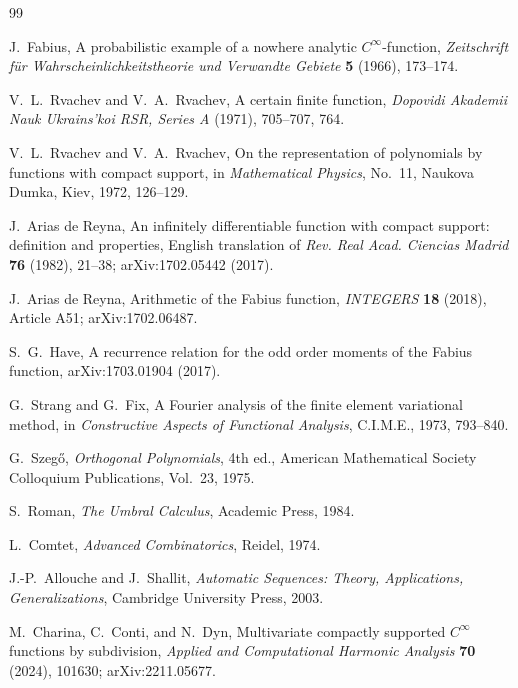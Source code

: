 \documentclass[11pt,oneside]{article}
\numberwithin{equation}{section}
\theoremstyle{definition}
\theoremstyle{remark}
\begin{document}
\begin{thebibliography}{99}

J.~Fabius,
\newblock A probabilistic example of a nowhere analytic $C^\infty$-function,
\newblock \emph{Zeitschrift f\"ur Wahrscheinlichkeitstheorie und Verwandte
Gebiete} \textbf{5} (1966), 173--174.

V.~L.~Rvachev and V.~A.~Rvachev,
\newblock A certain finite function,
\newblock \emph{Dopovidi Akademii Nauk Ukrains'koi RSR, Series A} (1971),
705--707, 764.

V.~L.~Rvachev and V.~A.~Rvachev,
\newblock On the representation of polynomials by functions with compact
support,
\newblock in \emph{Mathematical Physics}, No.~11, Naukova Dumka, Kiev, 1972,
126--129.

J.~Arias de Reyna,
\newblock An infinitely differentiable function with compact support:
definition and properties,
\newblock English translation of \emph{Rev. Real Acad. Ciencias Madrid}
\textbf{76} (1982), 21--38; arXiv:1702.05442 (2017).

J.~Arias de Reyna,
\newblock Arithmetic of the Fabius function,
\newblock \emph{INTEGERS} \textbf{18} (2018), Article A51;
arXiv:1702.06487.

S.~G.~Have,
\newblock A recurrence relation for the odd order moments of the Fabius
function,
\newblock arXiv:1703.01904 (2017).

G.~Strang and G.~Fix,
\newblock A Fourier analysis of the finite element variational method,
\newblock in \emph{Constructive Aspects of Functional Analysis}, C.I.M.E.,
1973, 793--840.

G.~Szeg\H{o},
\newblock \emph{Orthogonal Polynomials}, 4th ed.,
\newblock American Mathematical Society Colloquium Publications, Vol.~23,
1975.

S.~Roman,
\newblock \emph{The Umbral Calculus},
\newblock Academic Press, 1984.

L.~Comtet,
\newblock \emph{Advanced Combinatorics},
\newblock Reidel, 1974.

J.-P.~Allouche and J.~Shallit,
\newblock \emph{Automatic Sequences: Theory, Applications, Generalizations},
\newblock Cambridge University Press, 2003.

M.~Charina, C.~Conti, and N.~Dyn,
\newblock Multivariate compactly supported $C^\infty$ functions by subdivision,
\newblock \emph{Applied and Computational Harmonic Analysis} \textbf{70}
(2024), 101630; arXiv:2211.05677.


\end{thebibliography}
\end{document}
